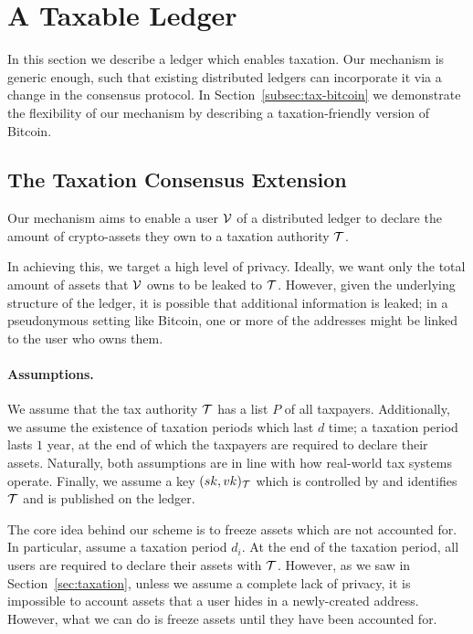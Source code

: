 \section{A Taxable Ledger}\label{sec:taxchain}

In this section we describe a ledger which enables taxation. Our mechanism is
generic enough, such that existing distributed ledgers can incorporate it via a
change in the consensus protocol. In Section~\ref{subsec:tax-bitcoin} we
demonstrate the flexibility of our mechanism by describing a taxation-friendly
version of Bitcoin.

\subsection{The Taxation Consensus Extension}\label{subsec:tax-ledger-extension}

Our mechanism aims to enable a user $\mathcal{V}$ of a distributed ledger to declare
the amount of crypto-assets they own to a taxation authority $\mathcal{T}$.

In achieving this, we target a high level of privacy. Ideally, we want only the
total amount of assets that $\mathcal{V}$ owns to be leaked to $\mathcal{T}$. However,
given the underlying structure of the ledger, it is possible that additional
information is leaked; \eg in a pseudonymous setting like Bitcoin, one or more
of the addresses might be linked to the user who owns them.

\paragraph{Assumptions.}

We assume that the tax authority $\mathcal{T}$ has a list $P$ of all taxpayers.
Additionally, we assume the existence of taxation periods which last $d$ time;
\eg a taxation period lasts $1$ year, at the end of which the taxpayers are
required to declare their assets. Naturally, both assumptions are in line with
how real-world tax systems operate. Finally, we assume a key
$(sk, vk)_\mathcal{T}$ which is controlled by and identifies $\mathcal{T}$ and is
published on the ledger.

The core idea behind our scheme is to freeze assets which are not accounted
for. In particular, assume a taxation period $d_i$. At the end of the taxation
period, all users are required to declare their assets with $\mathcal{T}$.
However, as we saw in Section~\ref{sec:taxation}, unless we assume a complete
lack of privacy, it is impossible to account assets that a user hides in a
newly-created address. However, what we can do is freeze assets until they have
been accounted for.

